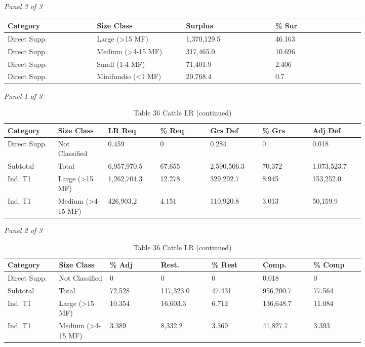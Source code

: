 \documentclass[12pt]{article}
\begin{document}
\begin{landscape}
\begin{table}[H]
\textit{Panel 3 of 3}\\[2pt]
{\fontsize{12}{14}\selectfont
\setlength{\tabcolsep}{3pt}
\renewcommand{\arraystretch}{1.08}
\begin{tabular}{p{0.205\linewidth}p{0.205\linewidth}p{0.205\linewidth}p{0.205\linewidth}}
\toprule
Category & Size Class & Surplus & \% Sur \\
\midrule
Direct Supp. & Large (>15 MF) & 1,370,129.5 & 46.163 \\
Direct Supp. & Medium (>4-15 MF) & 317,465.0 & 10.696 \\
Direct Supp. & Small (1-4 MF) & 71,401.9 & 2.406 \\
Direct Supp. & Minifundio (<1 MF) & 20,768.4 & 0.7 \\
\bottomrule
\end{tabular}
}
\end{table}
\begin{table}[H]
\centering
\caption{Table 36 Cattle LR (continued)}
\textit{Panel 1 of 3}\\[2pt]
{\fontsize{12}{14}\selectfont
\setlength{\tabcolsep}{3pt}
\renewcommand{\arraystretch}{1.08}
\begin{tabular}{p{0.117\linewidth}p{0.117\linewidth}p{0.117\linewidth}p{0.117\linewidth}p{0.117\linewidth}p{0.117\linewidth}p{0.117\linewidth}}
\toprule
Category & Size Class & LR Req & \% Req & Grs Def & \% Grs & Adj Def \\
\midrule
Direct Supp. & Not Classified & 0.459 & 0 & 0.284 & 0 & 0.018 \\
Subtotal & Total & 6,957,970.5 & 67.655 & 2,590,506.3 & 70.372 & 1,073,523.7 \\
Ind. T1 & Large (>15 MF) & 1,262,704.3 & 12.278 & 329,292.7 & 8.945 & 153,252.0 \\
Ind. T1 & Medium (>4-15 MF) & 426,903.2 & 4.151 & 110,920.8 & 3.013 & 50,159.9 \\
\bottomrule
\end{tabular}
}

\vspace{0.6em}

\textit{Panel 2 of 3}\\[2pt]
{\fontsize{12}{14}\selectfont
\setlength{\tabcolsep}{3pt}
\renewcommand{\arraystretch}{1.08}
\begin{tabular}{p{0.117\linewidth}p{0.117\linewidth}p{0.117\linewidth}p{0.117\linewidth}p{0.117\linewidth}p{0.117\linewidth}p{0.117\linewidth}}
\toprule
Category & Size Class & \% Adj & Rest. & \% Rest & Comp. & \% Comp \\
\midrule
Direct Supp. & Not Classified & 0 & 0 & 0 & 0.018 & 0 \\
Subtotal & Total & 72.528 & 117,323.0 & 47.431 & 956,200.7 & 77.564 \\
Ind. T1 & Large (>15 MF) & 10.354 & 16,603.3 & 6.712 & 136,648.7 & 11.084 \\
Ind. T1 & Medium (>4-15 MF) & 3.389 & 8,332.2 & 3.369 & 41,827.7 & 3.393 \\
\bottomrule
\end{tabular}
}


\end{table}
\end{landscape}
\end{document}
